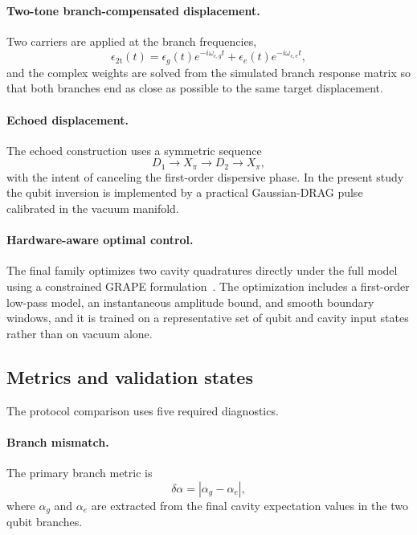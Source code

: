 \documentclass[aps,pra,twocolumn,reprint,floatfix,amsmath,amssymb]{revtex4-2}
\begin{document}
\paragraph*{Two-tone branch-compensated displacement.}
Two carriers are applied at the branch frequencies,
\begin{equation}
\epsilon_{\mathrm{2t}}(t) =
\epsilon_g(t)e^{-i\omega_{c,g} t}
+ \epsilon_e(t)e^{-i\omega_{c,e} t},
\label{eq:twotone}
\end{equation}
and the complex weights are solved from the simulated branch response matrix so that both branches end as close as possible to the same target displacement.

\paragraph*{Echoed displacement.}
The echoed construction uses a symmetric sequence
\begin{equation}
D_1 \rightarrow X_\pi \rightarrow D_2 \rightarrow X_\pi,
\end{equation}
with the intent of canceling the first-order dispersive phase. In the present study the qubit inversion is implemented by a practical Gaussian-DRAG pulse calibrated in the vacuum manifold.

\paragraph*{Hardware-aware optimal control.}
The final family optimizes two cavity quadratures directly under the full model using a constrained GRAPE formulation~\cite{khaneja2005grape,cqed_sim}. The optimization includes a first-order low-pass model, an instantaneous amplitude bound, and smooth boundary windows, and it is trained on a representative set of qubit and cavity input states rather than on vacuum alone.

\subsection{Metrics and validation states}

The protocol comparison uses five required diagnostics.

\paragraph*{Branch mismatch.}
The primary branch metric is
\begin{equation}
\delta \alpha = |\alpha_g - \alpha_e|,
\end{equation}
where \(\alpha_g\) and \(\alpha_e\) are extracted from the final cavity expectation values in the two qubit branches.
\end{document}
